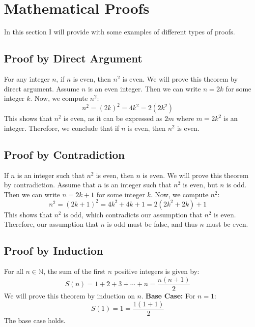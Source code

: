 \newpage
\section{Mathematical Proofs}

In this section I will provide with some examples of different types of proofs.

\subsection{Proof by Direct Argument}

For any integer \( n \), if \( n \) is even, then \( n^2 \) is even.
\newline
	We will prove this theorem by direct argument.
\newline
	Assume \( n \) is an even integer. Then we can write \( n = 2k \) for some integer \( k \).
\newline
	Now, we compute \( n^2 \):
	\[
		n^2 = {(2k)}^2 = 4k^2 = 2(2k^2)
	\]
	This shows that \( n^2 \) is even, as it can be expressed as \( 2m \) where \( m = 2k^2 \) is an integer.
	Therefore, we conclude that if \( n \) is even, then \( n^2 \) is even.
\QED

\subsection{Proof by Contradiction}

If \( n \) is an integer such that \( n^2 \) is even, then \( n \) is even.
\newline
	We will prove this theorem by contradiction. Assume that \( n \) is an integer such that \( n^2 \) is even, but \( n \) is odd. Then we can write \( n = 2k + 1 \) for some integer \( k \).
\newline
	Now, we compute \( n^2 \):
	\[
		n^2 = {(2k + 1)}^2 = 4k^2 + 4k + 1 = 2(2k^2 + 2k) + 1
	\]
	This shows that \( n^2 \) is odd, which contradicts our assumption that \( n^2 \) is even. Therefore, our assumption that \( n \) is odd must be false, and thus \( n \) must be even.
\QED

\subsection{Proof by Induction}

For all \( n \in \mathbb{N} \), the sum of the first \( n \) positive integers is given by:
\[
	S(n) = 1 + 2 + 3 + \cdots + n = \frac{n(n+1)}{2}
\]
We will prove this theorem by induction on \( n \).
\newline
	\textbf{Base Case:} For \( n = 1 \):
	\[
		S(1) = 1 = \frac{1(1+1)}{2}
	\]
	The base case holds.

